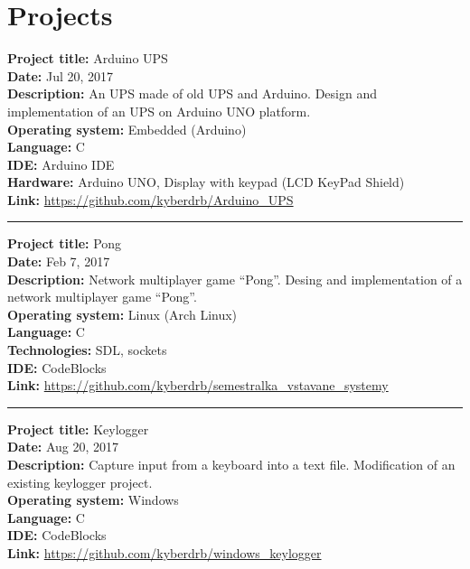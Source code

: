 \documentclass[slovak]{article}
\begin{document}
\section*{Projects}\label{projects}

\textbf{Project title:} Arduino UPS\\
\textbf{Date:} Jul 20, 2017\\
\textbf{Description:} An UPS made of old UPS and Arduino. Design and implementation of an UPS on Arduino UNO platform.\\
\textbf{Operating system:} Embedded (Arduino)\\
\textbf{Language:} C\\
\textbf{IDE:} Arduino IDE\\
\textbf{Hardware:} Arduino UNO, Display with keypad (LCD KeyPad Shield)\\
\textbf{Link:} \href{https://github.com/kyberdrb/Arduino\_UPS}{https://github.com/kyberdrb/Arduino\_UPS}

\begin{center}\rule{3in}{0.4pt}\end{center}

\noindent
\textbf{Project title:} Pong\\
\textbf{Date:} Feb 7, 2017\\
\textbf{Description:} Network multiplayer game ``Pong''. Desing and implementation of a network multiplayer game ``Pong''.\\
\textbf{Operating system:} Linux (Arch Linux)\\
\textbf{Language:} C\\
\textbf{Technologies:} SDL, sockets\\
\textbf{IDE:} CodeBlocks\\
\textbf{Link:} \href{https://github.com/kyberdrb/semestralka\_vstavane\_systemy}{https://github.com/kyberdrb/semestralka\_vstavane\_systemy}

\begin{center}\rule{3in}{0.4pt}\end{center}

\noindent
\textbf{Project title:} Keylogger\\
\textbf{Date:} Aug 20, 2017\\
\textbf{Description:} Capture input from a keyboard into a text file. Modification of an existing keylogger project.\\
\textbf{Operating system:} Windows\\
\textbf{Language:} C\\
\textbf{IDE:} CodeBlocks\\
\textbf{Link:} \href{https://github.com/kyberdrb/windows\_keylogger}{https://github.com/kyberdrb/windows\_keylogger}
\end{document}
